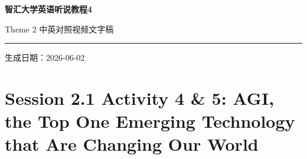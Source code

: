 \documentclass[UTF8,zihao=-4,fontset=fandol]{ctexart}
\begin{document}
\begin{titlepage}
\centering
\vspace*{2.9cm}
{\Huge\bfseries\textcolor{accent}{智汇大学英语听说教程4}\par}
\vspace{0.45cm}
{\LARGE Theme 2 中英对照视频文字稿\par}
\vspace{0.55cm}
{\textcolor{line}{\rule{0.52\textwidth}{0.6pt}}\par}
\vfill
{\large\textcolor{muted}{生成日期：2026-06-02}\par}
\end{titlepage}

\tableofcontents
\clearpage
{}


\clearpage
\section{Session 2.1 Activity 4 \& 5: AGI, the Top One Emerging Technology that Are Changing Our World}
\end{document}
